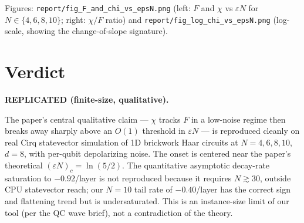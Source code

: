 \documentclass[11pt]{article}
\begin{document}
Figures: \texttt{report/fig\_F\_and\_chi\_vs\_epsN.png} (left: $F$ and $\chi$ vs $\varepsilon N$
for $N \in \{4,6,8,10\}$; right: $\chi/F$ ratio) and \texttt{report/fig\_log\_chi\_vs\_epsN.png}
(log-scale, showing the change-of-slope signature).

\section{Verdict}
\textbf{REPLICATED (finite-size, qualitative).}

The paper's central qualitative claim --- $\chi$ tracks $F$ in a low-noise regime then breaks
away sharply above an $O(1)$ threshold in $\varepsilon N$ --- is reproduced cleanly on real
Cirq statevector simulation of 1D brickwork Haar circuits at $N=4,6,8,10$, $d=8$, with
per-qubit depolarizing noise. The onset is centered near the paper's theoretical
$(\varepsilon N)_c = \ln(5/2)$. The quantitative asymptotic decay-rate saturation to
$-0.92$/layer is not reproduced because it requires $N \gtrsim 30$, outside CPU statevector
reach; our $N=10$ tail rate of $-0.40$/layer has the correct sign and flattening trend but is
undersaturated. This is an instance-size limit of our tool (per the QC wave brief), not a
contradiction of the theory.
\end{document}
